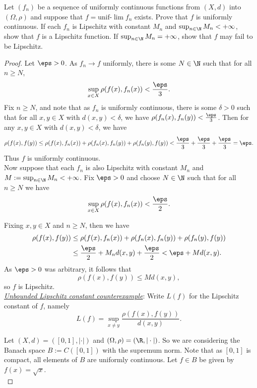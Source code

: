 \documentclass[12pt]{article}
\begin{document}
\begin{homeworkProblem}
Let $ (f_{n}) $ be a sequence of uniformly continuous functions from $ (X,d) $ into $ (\Omega, \rho) $ and suppose that $ f = \text{unif-}\lim f_{n} $ exists. Prove that $ f $ is uniformly continuous. If each $ f_{n} $ is Lipschitz with constant $ M_{n} $ and $ \sup_{n\in \N}M_{n} <+\infty $, show that $ f $ is a Lipschitz function. If $ \sup_{n\in \N}M_{n} = +\infty $, show that $ f $ may fail to be Lipschitz.

\begin{proof}
  Let $ \eps>0 $. As $ f_{n}\to f $ uniformly, there is some $ N\in \N $ such that for all $ n\geq N $,
  \[
    \sup_{x\in X} \rho(f(x), f_{n}(x)) < \frac{\eps}{3}.
  \]
  Fix $ n\geq N $, and note that as $ f_{n} $ is uniformly continuous, there is some $ \delta>0 $ such that for all $ x,y\in X $ with $ d(x,y)<\delta $, we have $ \rho(f_{n}(x), f_{n}(y)) < \frac{\eps}{3}$. Then for any $ x,y\in X $ with $ d(x,y)<\delta $, we have 
  \begin{align*}
   \rho(f(x), f(y)) \leq \rho(f(x), f_{n}(x)) + \rho(f_{n}(x), f_{n}(y)) + \rho(f_{n}(y), f(y))  < \frac{\eps}{3}+ \frac{\eps}{3} + \frac{\eps}{3} = \eps.
  \end{align*}
  Thus $ f $ is uniformly continuous.\\

  Now suppose that each $ f_{n} $ is also Lipschitz with constant $ M_{n} $ and $ M:=\sup_{n\in\N}M_{n}< +\infty $. Fix $ \eps>0 $ and choose $ N\in \N $ such that for all $ n\geq N $ we have
  \[
    \sup_{x\in X} \rho(f(x), f_{n}(x)) < \frac{\eps}{2}.
  \]

  Fixing $ x,y\in X $ and $ n\geq N $, then we have 
  \begin{align*}
    \rho(f(x), f(y)) &\leq \rho(f(x), f_{n}(x)) + \rho(f_{n}(x), f_{n}(y)) + \rho(f_{n}(y), f(y))  \\
    &\leq \frac{\eps}{2}+   M_{n}d(x,y) +\frac{\eps}{2} < \eps + Md(x,y).
  \end{align*}
  As $ \eps>0 $ was arbitrary, it follows that 
  \[
    \rho(f(x), f(y)) \leq M d(x,y),
  \]
  so $ f $ is Lipschitz. \\


  \underline{\emph{Unbounded Lipschitz constant counterexample}}:
  Write $ L(f) $ for the Lipschitz constant of $ f $, namely
  \[
    L(f) = \sup_{x\neq y} \frac{\rho(f(x),f(y))}{d(x,y)}.
  \]

  Let $ (X,d) = ([0,1] ,|\cdot|) $ and $ (\Omega,\rho) = (\R, |\cdot|) $. So we are considering the Banach space $ B:= C([0,1]) $ with the supremum norm. Note that as $ [0,1] $ is compact, all elements of $ B $ are uniformly continuous. Let $ f\in B $ be given by $ f(x) = \sqrt{x} $.  \\


\end{proof}
\end{homeworkProblem}
\end{document}
